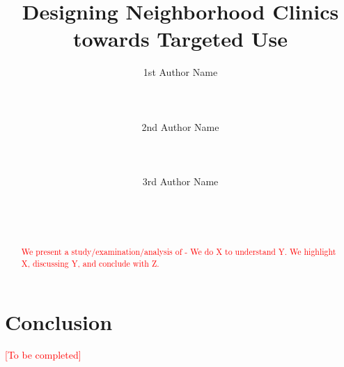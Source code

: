 \documentclass{sigchi}
\begin{document}
\title{Designing Neighborhood Clinics towards Targeted Use}

\author{
  \alignauthor 1st Author Name\\
    \\
    \\
    \\
  \alignauthor 2nd Author Name\\
    \\
    \\
    \\
  \alignauthor 3rd Author Name\\
    \\
    \\
    \\
}

\maketitle

\begin{abstract}
\begin{comment}
You should write an abstract early on, knowing fully well that you will (and should) iterate through it at least 3-4 times. It is also the thing you should edit again just before you submit.
\end{comment}
\textcolor{red}{We present a study/examination/analysis of - We do X to understand Y. We highlight X, discussing Y, and conclude with Z.
}
\end{abstract}










\section{Conclusion}

\textcolor{red}{[To be completed]}
\balance



\end{document}
